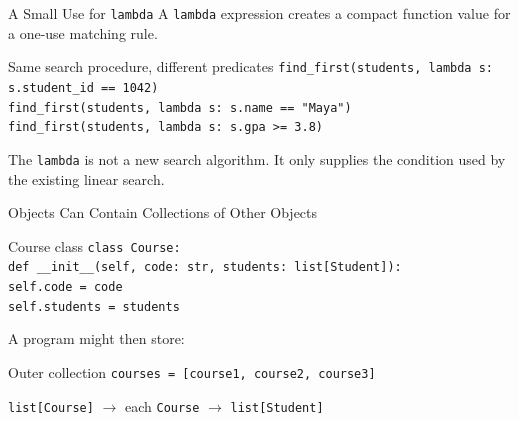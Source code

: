 \documentclass[aspectratio=169,10pt]{beamer}
\begin{document}
\begin{frame}{A Small Use for \texttt{lambda}}
  A \texttt{lambda} expression creates a compact function value for a one-use matching rule.

  \begin{block}{Same search procedure, different predicates}
    \texttt{find\_first(students, lambda s: s.student\_id == 1042)}\\[0.05in]
    \texttt{find\_first(students, lambda s: s.name == "Maya")}\\[0.05in]
    \texttt{find\_first(students, lambda s: s.gpa >= 3.8)}
  \end{block}

  \begin{keyidea}
    The \texttt{lambda} is not a new search algorithm. It only supplies the condition used by the existing linear search.
  \end{keyidea}
\end{frame}


\begin{frame}{Objects Can Contain Collections of Other Objects}
  \begin{block}{Course class}
    \texttt{class Course:}\\
    \hspace*{0.20in}\texttt{def \_\_init\_\_(self, code: str, students: list[Student]):}\\
    \hspace*{0.40in}\texttt{self.code = code}\\
    \hspace*{0.40in}\texttt{self.students = students}
  \end{block}

  A program might then store:
  \begin{block}{Outer collection}
    \texttt{courses = [course1, course2, course3]}
  \end{block}

  \begin{center}
    \texttt{list[Course]} $\rightarrow$ each \texttt{Course} $\rightarrow$ \texttt{list[Student]}
  \end{center}
\end{frame}
\end{document}
